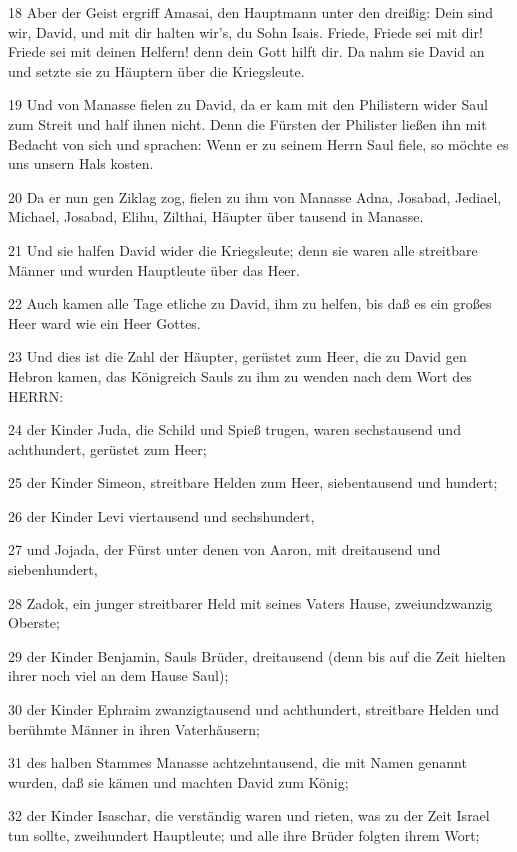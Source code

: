 \par 18 Aber der Geist ergriff Amasai, den Hauptmann unter den dreißig: Dein sind wir, David, und mit dir halten wir's, du Sohn Isais. Friede, Friede sei mit dir! Friede sei mit deinen Helfern! denn dein Gott hilft dir. Da nahm sie David an und setzte sie zu Häuptern über die Kriegsleute.
\par 19 Und von Manasse fielen zu David, da er kam mit den Philistern wider Saul zum Streit und half ihnen nicht. Denn die Fürsten der Philister ließen ihn mit Bedacht von sich und sprachen: Wenn er zu seinem Herrn Saul fiele, so möchte es uns unsern Hals kosten.
\par 20 Da er nun gen Ziklag zog, fielen zu ihm von Manasse Adna, Josabad, Jediael, Michael, Josabad, Elihu, Zilthai, Häupter über tausend in Manasse.
\par 21 Und sie halfen David wider die Kriegsleute; denn sie waren alle streitbare Männer und wurden Hauptleute über das Heer.
\par 22 Auch kamen alle Tage etliche zu David, ihm zu helfen, bis daß es ein großes Heer ward wie ein Heer Gottes.
\par 23 Und dies ist die Zahl der Häupter, gerüstet zum Heer, die zu David gen Hebron kamen, das Königreich Sauls zu ihm zu wenden nach dem Wort des HERRN:
\par 24 der Kinder Juda, die Schild und Spieß trugen, waren sechstausend und achthundert, gerüstet zum Heer;
\par 25 der Kinder Simeon, streitbare Helden zum Heer, siebentausend und hundert;
\par 26 der Kinder Levi viertausend und sechshundert,
\par 27 und Jojada, der Fürst unter denen von Aaron, mit dreitausend und siebenhundert,
\par 28 Zadok, ein junger streitbarer Held mit seines Vaters Hause, zweiundzwanzig Oberste;
\par 29 der Kinder Benjamin, Sauls Brüder, dreitausend (denn bis auf die Zeit hielten ihrer noch viel an dem Hause Saul);
\par 30 der Kinder Ephraim zwanzigtausend und achthundert, streitbare Helden und berühmte Männer in ihren Vaterhäusern;
\par 31 des halben Stammes Manasse achtzehntausend, die mit Namen genannt wurden, daß sie kämen und machten David zum König;
\par 32 der Kinder Isaschar, die verständig waren und rieten, was zu der Zeit Israel tun sollte, zweihundert Hauptleute; und alle ihre Brüder folgten ihrem Wort;
